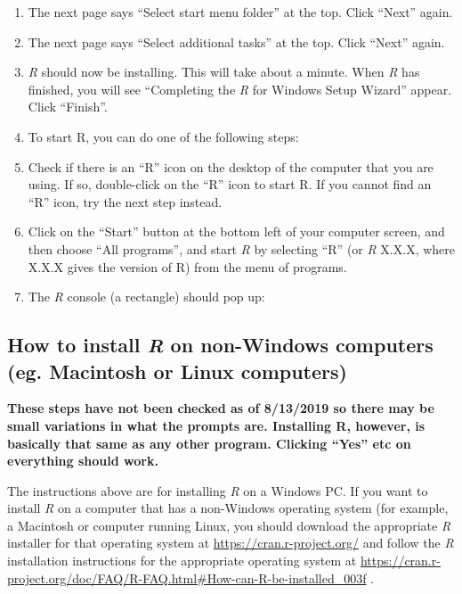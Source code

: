 \documentclass[
]{book}
\begin{document}
\begin{enumerate}
\item
  The next page says ``Select start menu folder'' at the top. Click ``Next'' again.
\item
  The next page says ``Select additional tasks'' at the top. Click ``Next'' again.
\item
  \emph{R} should now be installing. This will take about a minute. When \emph{R} has finished, you will see ``Completing the \emph{R} for Windows Setup Wizard'' appear. Click ``Finish''.
\item
  To start R, you can do one of the following steps:
\item
  Check if there is an ``R'' icon on the desktop of the computer that you are using. If so, double-click on the ``R'' icon to start R. If you cannot find an ``R'' icon, try the next step instead.
\item
  Click on the ``Start'' button at the bottom left of your computer screen, and then choose ``All programs'', and start \emph{R} by selecting ``R'' (or \emph{R} X.X.X, where X.X.X gives the version of R) from the menu of programs.
\item
  The \emph{R} console (a rectangle) should pop up:
\end{enumerate}

\hypertarget{how-to-install-r-on-non-windows-computers-eg.-macintosh-or-linux-computers}{%
\subsection{\texorpdfstring{How to install \emph{R} on non-Windows computers (eg. Macintosh or Linux computers)}{How to install R on non-Windows computers (eg. Macintosh or Linux computers)}}\label{how-to-install-r-on-non-windows-computers-eg.-macintosh-or-linux-computers}}

\textbf{These steps have not been checked as of 8/13/2019 so there may be small variations in what the prompts are. Installing R, however, is basically that same as any other program. Clicking ``Yes'' etc on everything should work.}

The instructions above are for installing \emph{R} on a Windows PC. If you want to install \emph{R} on a computer that has a non-Windows operating system (for example, a Macintosh or computer running Linux, you should download the appropriate \emph{R} installer for that operating system at \url{https://cran.r-project.org/} and follow the \emph{R} installation instructions for the appropriate operating system at \url{https://cran.r-project.org/doc/FAQ/R-FAQ.html\#How-can-R-be-installed_003f} .
\end{document}
